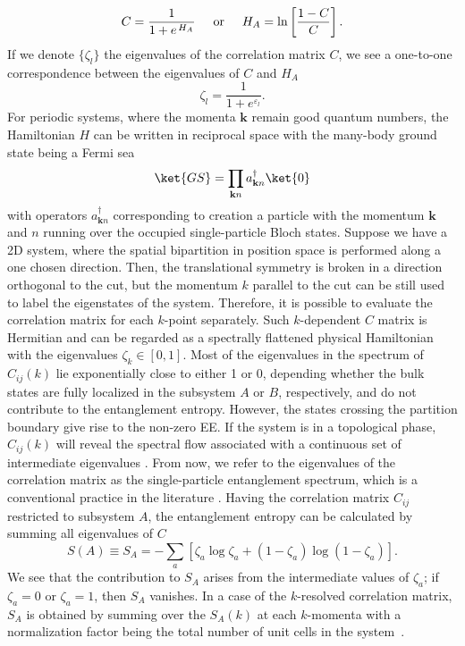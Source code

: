 \begin{equation}
C = \frac{1}{1 + e^{\, H_A }}  \hspace*{0.5cm} \mathrm{or} \hspace*{0.5cm} H_A  = \ln \left[ \frac{1 - C}{C} \right].
\end{equation}
If we denote $\lbrace \zeta_l \rbrace$ the eigenvalues of the correlation matrix $C$, we see a one-to-one correspondence between the eigenvalues of $C$ and $H_A$
\begin{equation}
\zeta_l = \frac{1}{1+e^{\varepsilon_l}}.
\end{equation}
For periodic systems, where the momenta $\mathbf{k}$ remain good quantum numbers, the Hamiltonian $H$ can be written in reciprocal space with the many-body ground state being a Fermi sea
\begin{equation}
\ket{GS} = \prod_{\mathbf{k} n}  a^{\dagger}_{\mathbf{k} n} \ket{0}
\end{equation}
with operators $a^{\dagger}_{\mathbf{k} n}$ corresponding to creation a particle with the momentum $\mathbf{k}$ and $n$ running over the occupied single-particle Bloch states. Suppose we have a 2D system, where the spatial bipartition in position space is performed along a one chosen direction. Then, the translational symmetry is broken in a direction orthogonal to the cut, but the momentum $k$ parallel to the cut can be still used to label the eigenstates of the system. Therefore, it is possible to evaluate the correlation matrix for each $k$-point separately. Such $k$-dependent $C$ matrix is Hermitian and can be regarded as a spectrally flattened physical Hamiltonian with the eigenvalues $\zeta_k \in [0, 1]$. Most of the eigenvalues in the spectrum of $C_{ij}(k)$ lie exponentially close to either 1 or 0, depending whether the bulk states are fully localized in the subsystem $A$ or $B$, respectively, and do not contribute to the entanglement entropy. However, the states crossing the partition boundary give rise to the non-zero EE. If the system is in a topological phase, $C_{ij} (k)$ will reveal the spectral flow associated with a continuous set of intermediate eigenvalues \cite{Hughes:inv, Vish:inv}. From now, we refer to the eigenvalues of the correlation matrix as the single-particle entanglement spectrum, which is a conventional practice in the literature \cite{Alex:CM, Vish:inv, Hughes:inv}. Having the correlation matrix $C_{ij}$ restricted to subsystem $A$, the entanglement entropy can be calculated by summing all eigenvalues of $C$
\begin{equation}
S(A) \equiv S_A = - \sum_a \left[ \zeta_a \log \zeta_a + \left( 1 - \zeta_a \right) \log \left( 1 - \zeta_a \right) \right].
\label{eq:entCij}
\end{equation}
We see that the contribution to $S_A$ arises from the intermediate values of $\zeta_a$; if $\zeta_a = 0$ or $\zeta_a = 1$, then $S_A$ vanishes. In a case of the $k$-resolved correlation matrix, $S_A$ is obtained by summing over the $S_A (k)$ at each $k$-momenta with a normalization factor being the total number of unit cells in the system~\cite{Ryu:EE}.

